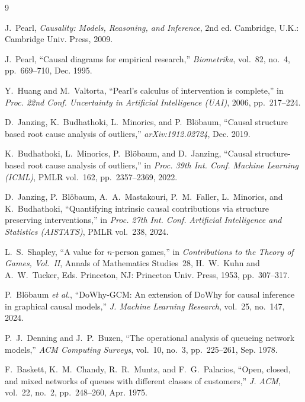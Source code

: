 \documentclass[11pt,a4paper]{article}
\begin{document}
\begin{thebibliography}{9}

J.~Pearl, \emph{Causality: Models, Reasoning, and Inference}, 2nd ed.
Cambridge, U.K.: Cambridge Univ. Press, 2009.

J.~Pearl, ``Causal diagrams for empirical research,'' \emph{Biometrika},
vol.~82, no.~4, pp.~669--710, Dec. 1995.

Y.~Huang and M.~Valtorta, ``Pearl's calculus of intervention is complete,''
in \emph{Proc. 22nd Conf. Uncertainty in Artificial Intelligence (UAI)},
2006, pp.~217--224.

D.~Janzing, K.~Budhathoki, L.~Minorics, and P.~Bl\"obaum,
``Causal structure based root cause analysis of outliers,''
\emph{arXiv:1912.02724}, Dec. 2019.

K.~Budhathoki, L.~Minorics, P.~Bl\"obaum, and D.~Janzing,
``Causal structure-based root cause analysis of outliers,''
in \emph{Proc. 39th Int. Conf. Machine Learning (ICML)}, PMLR vol.~162,
pp.~2357--2369, 2022.

D.~Janzing, P.~Bl\"obaum, A.~A.~Mastakouri, P.~M.~Faller, L.~Minorics,
and K.~Budhathoki, ``Quantifying intrinsic causal contributions via
structure preserving interventions,'' in \emph{Proc. 27th Int. Conf.
Artificial Intelligence and Statistics (AISTATS)}, PMLR vol.~238, 2024.

L.~S.~Shapley, ``A value for $n$-person games,'' in \emph{Contributions to
the Theory of Games, Vol.~II}, Annals of Mathematics Studies~28,
H.~W.~Kuhn and A.~W.~Tucker, Eds. Princeton, NJ: Princeton Univ. Press,
1953, pp.~307--317.

P.~Bl\"obaum \emph{et al.}, ``DoWhy-GCM: An extension of DoWhy for causal
inference in graphical causal models,'' \emph{J. Machine Learning Research},
vol.~25, no.~147, 2024.

P.~J.~Denning and J.~P.~Buzen, ``The operational analysis of queueing
network models,'' \emph{ACM Computing Surveys}, vol.~10, no.~3,
pp.~225--261, Sep. 1978.

F.~Baskett, K.~M.~Chandy, R.~R.~Muntz, and F.~G.~Palacios, ``Open, closed,
and mixed networks of queues with different classes of customers,''
\emph{J. ACM}, vol.~22, no.~2, pp.~248--260, Apr. 1975.

\end{thebibliography}
\end{document}
